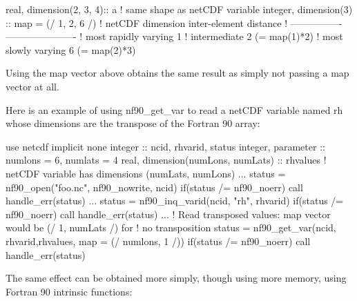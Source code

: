 \begin{DoxyCode}
\textcolor{keywordtype}{real},    \textcolor{keywordtype}{dimension(2, 3, 4)}:: a  \textcolor{comment}{! same shape as netCDF variable}
\textcolor{keywordtype}{integer}, \textcolor{keywordtype}{dimension(3)}      :: map  = (/ 1, 2, 6 /)
                    \textcolor{comment}{! netCDF dimension inter-element distance}
                    \textcolor{comment}{! ---------------- ----------------------}
                    \textcolor{comment}{! most rapidly varying       1}
                    \textcolor{comment}{! intermediate               2 (= map(1)*2)}
                    ! most slowly varying        6 (= map(2)*3)
\end{DoxyCode}


Using the map vector above obtains the same result as simply not passing a map vector at all.

Here is an example of using nf90\+\_\+get\+\_\+var to read a net\+C\+DF variable named rh whose dimensions are the transpose of the Fortran 90 array\+:


\begin{DoxyCode}
\textcolor{keywordtype}{use }netcdf
\textcolor{keywordtype}{implicit none}
\textcolor{keywordtype}{integer}                           :: ncid, rhvarid, status
\textcolor{keywordtype}{integer}, \textcolor{keywordtype}{parameter}                :: numlons = 6, numlats = 4
\textcolor{keywordtype}{real}, \textcolor{keywordtype}{dimension(numLons, numLats)} :: rhvalues
\textcolor{comment}{! netCDF variable has dimensions (numLats, numLons)}
...
status = nf90\_open(\textcolor{stringliteral}{"foo.nc"}, nf90\_nowrite, ncid)
\textcolor{keywordflow}{if}(status /= nf90\_noerr) \textcolor{keyword}{call }handle\_err(status)
...
status = nf90\_inq\_varid(ncid, \textcolor{stringliteral}{"rh"}, rhvarid)
\textcolor{keywordflow}{if}(status /= nf90\_noerr) \textcolor{keyword}{call }handle\_err(status)
...
\textcolor{comment}{! Read transposed values: map vector would be (/ 1, numLats /) for}
\textcolor{comment}{!   no transposition}
status = nf90\_get\_var(ncid, rhvarid,rhvalues, map = (/ numlons, 1 /))
\textcolor{keywordflow}{if}(status /= nf90\_noerr) \textcolor{keyword}{call }handle\_err(status)
\end{DoxyCode}


The same effect can be obtained more simply, though using more memory, using Fortran 90 intrinsic functions\+:


